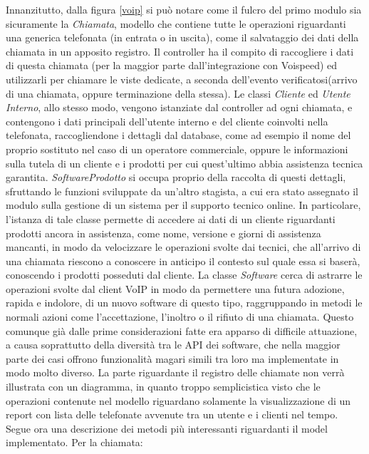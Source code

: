 \noindent
Innanzitutto, dalla figura \ref{voip} si pu\`o notare come il fulcro del primo modulo sia sicuramente la \textit{Chiamata}, modello che contiene tutte le operazioni riguardanti una generica telefonata (in entrata o in uscita), come il salvataggio dei dati della chiamata in un apposito registro. Il controller ha il compito di raccogliere i dati di questa chiamata (per la maggior parte dall'integrazione con Voispeed) ed utilizzarli per chiamare le viste dedicate, a seconda dell'evento verificatosi(arrivo di una chiamata, oppure terminazione della stessa). Le classi \textit{Cliente} ed \textit{Utente Interno}, allo stesso modo, vengono istanziate dal controller ad ogni chiamata, e contengono i dati principali dell'utente interno e del cliente coinvolti nella telefonata, raccogliendone i dettagli dal database, come ad esempio il nome del proprio sostituto nel caso di un operatore commerciale, oppure le informazioni sulla tutela di un cliente e i prodotti per cui quest'ultimo abbia assistenza tecnica garantita. \textit{SoftwareProdotto} si occupa proprio della raccolta di questi dettagli, sfruttando le funzioni sviluppate da un'altro stagista, a cui era stato assegnato il modulo sulla gestione di un sistema per il supporto tecnico online. In particolare, l'istanza di tale classe permette di accedere ai dati di un cliente riguardanti prodotti ancora in assistenza, come nome, versione e giorni di assistenza mancanti, in modo da velocizzare le operazioni svolte dai tecnici, che all'arrivo di una chiamata riescono a conoscere in anticipo il contesto sul quale essa si baser\`a, conoscendo i prodotti posseduti dal cliente. 
La classe \textit{Software} cerca di astrarre le operazioni svolte dal client VoIP in modo da permettere una futura adozione, rapida e  indolore, di un nuovo software di questo tipo, raggruppando in metodi le normali azioni come l'accettazione, l'inoltro o il rifiuto di una chiamata. Questo comunque gi\`a dalle prime considerazioni fatte era apparso di difficile attuazione, a causa soprattutto della diversit\`a tra le API dei software, che nella maggior parte dei casi offrono funzionalit\`a magari simili tra loro ma implementate in modo molto diverso. 
La parte riguardante il registro delle chiamate non verr\`a illustrata con un diagramma, in quanto troppo semplicistica visto che le operazioni contenute nel modello riguardano solamente la visualizzazione di un report con lista delle telefonate avvenute tra un utente e i clienti nel tempo.
Segue ora una descrizione dei metodi pi\`u interessanti riguardanti il model implementato.
Per la chiamata:
